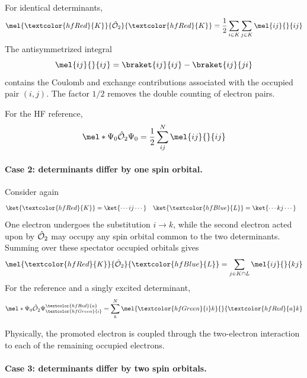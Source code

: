 \documentclass[11pt,a4paper,titlepage]{article}
\numberwithin{equation}{section}
\newcommand{\chO}{\Hat{\mathcal{O}}}
\newcommand{\red}[1]{\textcolor{hfRed}{#1}}
\newcommand{\green}[1]{\textcolor{hfGreen}{#1}}
\newcommand{\blue}[1]{\textcolor{hfBlue}{#1}}
\begin{document}
For identical determinants,
\begin{equation}
  \mel{\red{K}}{\chO_2}{\red{K}}
  =
  \frac{1}{2}
  \sum_{i\in K}\sum_{j\in K}
  \mel{ij}{}{ij}
  \label{eq:sc-two-zero}
\end{equation}
The antisymmetrized integral
\begin{equation}
  \mel{ij}{}{ij}
  =
  \braket{ij}{ij}
  -
  \braket{ij}{ji}
\end{equation}
contains the Coulomb and exchange contributions associated with the occupied
pair $(i,j)$. The factor $1/2$ removes the double counting of electron
pairs.

For the HF reference,
\begin{equation}
  \mel*{\Psi_0}{\chO_2}{\Psi_0}
  =
  \frac{1}{2}
  \sum_{ij}^{N}
  \mel{ij}{}{ij}
\end{equation}

\paragraph{Case 2: determinants differ by one spin orbital.}

Consider again
\begin{align}
  \ket{\red{K}}
  &=
  \ket{\cdots i j\cdots}
  &
  \ket{\blue{L}}
  &=
  \ket{\cdots k j\cdots}
\end{align}
One electron undergoes the substitution $i\rightarrow k$, while the second
electron acted upon by $\chO_2$ may occupy any spin orbital common to the two
determinants. Summing over these spectator occupied orbitals gives
\begin{equation}
  \mel{\red{K}}{\chO_2}{\blue{L}}
  =
  \sum_{j\in K\cap L}
  \mel{ij}{}{kj}
  \label{eq:sc-two-one}
\end{equation}
For the reference and a singly excited determinant,
\begin{equation}
  \mel*{\Psi_0}{\chO_2}
  {\Psi_{\green{i}}^{\red{a}}}
  =
  \sum_{k}^{N}
  \mel{\green{i}k}{}{\red{a}k}
  \label{eq:sc-reference-single-two-body}
\end{equation}

Physically, the promoted electron is coupled through the two-electron
interaction to each of the remaining occupied electrons.

\paragraph{Case 3: determinants differ by two spin orbitals.}
\end{document}
